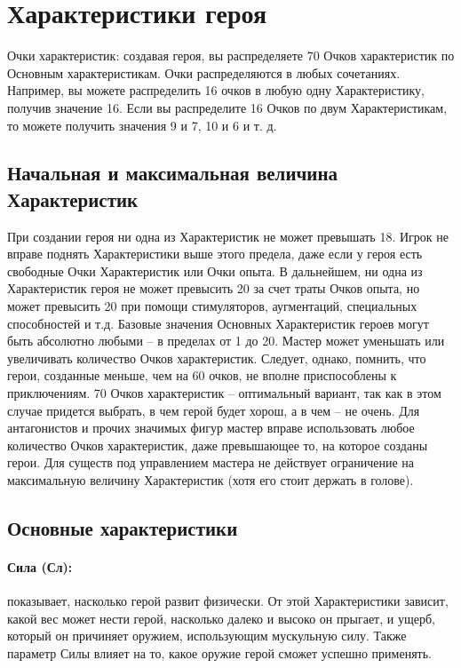 \section{Характеристики героя}
Очки характеристик: создавая героя, вы распределяете 70 Очков характеристик по Основным характеристикам. Очки распределяются в любых сочетаниях. Например, вы можете распределить 16 очков в любую одну Характеристику, получив значение 16. Если вы распределите 16 Очков по двум Характеристикам, то можете получить значения 9 и 7, 10 и 6 и т. д.

\subsection{Начальная и максимальная величина Характеристик}
При создании героя ни одна из Характеристик не может превышать 18. Игрок не вправе поднять Характеристики выше этого предела, даже если у героя есть свободные Очки Характеристик или Очки опыта. В дальнейшем, ни одна из Характеристик героя не может превысить 20 за счет траты Очков опыта, но может превысить 20 при помощи стимуляторов, аугментаций, специальных способностей и т.д.
\newline Базовые значения Основных Характеристик героев могут быть абсолютно любыми – в пределах от 1 до 20.
\newline Мастер может уменьшать или увеличивать количество Очков характеристик. Следует, однако, помнить, что герои, созданные меньше, чем на 60 очков, не вполне приспособлены к приключениям. 70 Очков характеристик – оптимальный вариант, так как в этом случае придется выбрать, в чем герой будет хорош, а в чем – не очень.
\newline Для антагонистов и прочих значимых фигур мастер вправе использовать любое количество Очков характеристик, даже превышающее то, на которое созданы герои. Для существ под управлением мастера не действует ограничение на максимальную величину Характеристик (хотя его стоит держать в голове).

\subsection{Основные характеристики}
\paragraph{Сила (Сл):} показывает, насколько герой развит физически. От этой Характеристики зависит, какой вес может нести герой, насколько далеко и высоко он прыгает, и ущерб, который он причиняет оружием, использующим мускульную силу. Также параметр Силы влияет на то, какое оружие герой сможет успешно применять.

